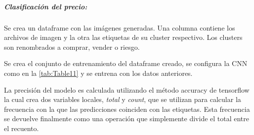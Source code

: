 \subparagraph{Clasificación del precio:}
Se crea un dataframe con las imágenes generadas. Una columna contiene los archivos de imagen y la otra las etiquetas de su cluster respectivo. Los clusters son renombrados a comprar, vender o riesgo.

Se crea el conjunto de entrenamiento del dataframe creado, se configura la CNN como en la \autoref{tab:Table11} y se entrena con los datos anteriores.

La precisión del modelo es calculada utilizando el método accuracy de tensorflow la cual crea dos variables locales, \emph{total} y \emph{count}, que se utilizan para calcular la frecuencia con la que las predicciones coinciden con las etiquetas. Esta frecuencia se devuelve finalmente como una operación que simplemente divide el total entre el recuento.





